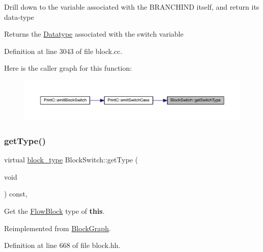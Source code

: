 Drill down to the variable associated with the B\+R\+A\+N\+C\+H\+I\+ND itself, and return its data-\/type \begin{DoxyReturn}{Returns}
the \mbox{\hyperlink{class_datatype}{Datatype}} associated with the switch variable 
\end{DoxyReturn}


Definition at line 3043 of file block.\+cc.

Here is the caller graph for this function\+:
\nopagebreak
\begin{figure}[H]
\begin{center}
\leavevmode
\includegraphics[width=350pt]{class_block_switch_a1f9c2081ef18f91022fd21ff2770fa67_icgraph}
\end{center}
\end{figure}
\mbox{\label{class_block_switch_a9796f852aa205ba32346ae9d249f94c1}} 
\subsubsection{\texorpdfstring{getType()}{getType()}}
{\footnotesize\ttfamily virtual \mbox{\hyperlink{class_flow_block_a70df78390870fcdd51e31426ba6a193e}{block\+\_\+type}} Block\+Switch\+::get\+Type (\begin{DoxyParamCaption}\item[{void}]{ }\end{DoxyParamCaption}) const\hspace{0.3cm}{\ttfamily [inline]}, {\ttfamily [virtual]}}



Get the \mbox{\hyperlink{class_flow_block}{Flow\+Block}} type of {\bfseries{this}}. 



Reimplemented from \mbox{\hyperlink{class_block_graph_a8e542e109e0acc977218ceaf3c248153}{Block\+Graph}}.



Definition at line 668 of file block.\+hh.

